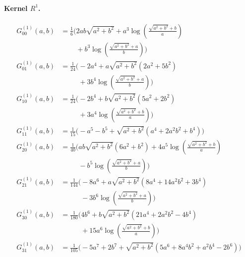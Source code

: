 \paragraph{Kernel $R^{1}$.}
\begin{align*}
G^{(1)}_{00}(a,b) &= \frac{1}{6}\Bigg(2 a b \sqrt{a^{2} + b^{2}} + a^{3} \log\left(\frac{\sqrt{a^{2} + b^{2}} + b}{a}\right)\\
&\phantom{{}=\frac{1}{6}\Bigg(}+ b^{3} \log\left(\frac{\sqrt{a^{2} + b^{2}} + a}{b}\right)\Bigg)\\[1.2ex]
G^{(1)}_{01}(a,b) &= \frac{1}{24}\Bigg(- 2 a^{4} + a \sqrt{a^{2} + b^{2}}\left(2 a^{2} + 5 b^{2}\right)\\
&\phantom{{}=\frac{1}{24}\Bigg(}+ 3 b^{4} \log\left(\frac{\sqrt{a^{2} + b^{2}} + a}{b}\right)\Bigg)\\[1.2ex]
G^{(1)}_{10}(a,b) &= \frac{1}{24}\Bigg(- 2 b^{4} + b \sqrt{a^{2} + b^{2}}\left(5 a^{2} + 2 b^{2}\right)\\
&\phantom{{}=\frac{1}{24}\Bigg(}+ 3 a^{4} \log\left(\frac{\sqrt{a^{2} + b^{2}} + b}{a}\right)\Bigg)\\[1.2ex]
G^{(1)}_{11}(a,b) &= \frac{1}{15}\Bigg(- a^{5} - b^{5} + \sqrt{a^{2} + b^{2}}\left(a^{4} + 2 a^{2} b^{2} + b^{4}\right)\Bigg)\\[1.2ex]
G^{(1)}_{20}(a,b) &= \frac{1}{40}\Bigg(a b \sqrt{a^{2} + b^{2}}\left(6 a^{2} + b^{2}\right) + 4 a^{5} \log\left(\frac{\sqrt{a^{2} + b^{2}} + b}{a}\right)\\
&\phantom{{}=\frac{1}{40}\Bigg(}- b^{5} \log\left(\frac{\sqrt{a^{2} + b^{2}} + a}{b}\right)\Bigg)\\[1.2ex]
G^{(1)}_{21}(a,b) &= \frac{1}{144}\Bigg(- 8 a^{6} + a \sqrt{a^{2} + b^{2}}\left(8 a^{4} + 14 a^{2} b^{2} + 3 b^{4}\right)\\
&\phantom{{}=\frac{1}{144}\Bigg(}- 3 b^{6} \log\left(\frac{\sqrt{a^{2} + b^{2}} + a}{b}\right)\Bigg)\\[1.2ex]
G^{(1)}_{30}(a,b) &= \frac{1}{180}\Bigg(4 b^{6} + b \sqrt{a^{2} + b^{2}}\left(21 a^{4} + 2 a^{2} b^{2} - 4 b^{4}\right)\\
&\phantom{{}=\frac{1}{180}\Bigg(}+ 15 a^{6} \log\left(\frac{\sqrt{a^{2} + b^{2}} + b}{a}\right)\Bigg)\\[1.2ex]
G^{(1)}_{31}(a,b) &= \frac{1}{105}\Bigg(- 5 a^{7} + 2 b^{7} + \sqrt{a^{2} + b^{2}}\left(5 a^{6} + 8 a^{4} b^{2} + a^{2} b^{4} - 2 b^{6}\right)\Bigg)
\end{align*}
